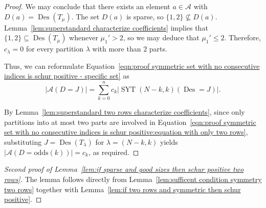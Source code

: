 \documentclass[11pt]{article}
\theoremstyle{definition}
\numberwithin{equation}{section}
\newcommand{\Des}{\operatorname{Des}}
\newcommand{\Syt}{\operatorname{SYT}}
\newcommand{\A}{\mathcal{A}}
\newcommand{\odds}{\mathrm{odds}}
\begin{document}
\begin{proof}
    We may conclude that there exists an element $a \in \A$ with $D(a) = \Des(T_\mu)$. The set $D(a)$ is sparse, so $\{1,2\} \nsubseteq D(a)$. Lemma~\ref{lem:superstandard characterize coefficients} implies that $\{1,2\} \subseteq \Des(T_\mu)$ whenever $\mu_1' >2$, so we may deduce that $\mu_1' \le 2$. Therefore, $c_\lambda = 0$ for every partition $\lambda$ with more than $2$ parts.
    
    Thus, we can reformulate Equation~\eqref{eqn:proof symmetric set with no consecutive indices is schur positive - specific set} as
    \begin{equation}\label{eqn:proof symmetric set with no consecutive indices is schur positive:equation with only two rows}
        |\A(D = J)| = \sum_{k=0}^n c_k \left|\Syt(N-k,k)(\Des = J)\right|.
    \end{equation}
    
    By Lemma~\ref{lem:superstandard two rows characterize coefficients}, since only partitions into at most two parts are involved in Equation~\eqref{eqn:proof symmetric set with no consecutive indices is schur positive:equation with only two rows}, substituting $J = \Des(T_{\lambda})$ for $\lambda = (N-k,k)$ yields $|\A(D = \odds(k))| = c_k$, as required.
\end{proof}

\begin{proof}[Second proof of Lemma~\ref{lem:if sparse and good sizes then schur positive two rows}]
    The lemma follows directly from Lemma~\ref{lem:sufficent condition symmetry two rows} together with Lemma~\ref{lem:if two rows and symmetric then schur positive}.
\end{proof}
\end{document}
